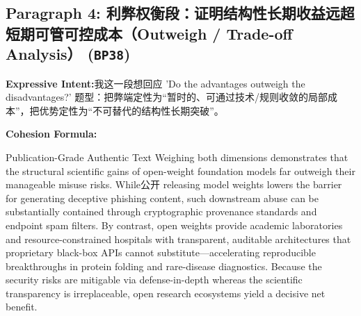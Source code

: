 \subsection*{Paragraph 4: 利弊权衡段：证明结构性长期收益远超短期可管可控成本（Outweigh / Trade-off Analysis） (\texttt{BP38})}
\noindent\textbf{Expressive Intent:}\enspace 我这一段想回应 'Do the advantages outweigh the disadvantages?' 题型：把弊端定性为“暂时的、可通过技术/规则收敛的局部成本”，把优势定性为“不可替代的结构性长期突破”。\par
\noindent\textbf{Cohesion Formula:}\par\vspace{4pt}
\begin{ExampleBox}{Publication-Grade Authentic Text}
Weighing both dimensions demonstrates that the structural scientific gains of open-weight foundation models far outweigh their manageable misuse risks. While公开 releasing model weights lowers the barrier for generating deceptive phishing content, such downstream abuse can be substantially contained through cryptographic provenance standards and endpoint spam filters. By contrast, open weights provide academic laboratories and resource-constrained hospitals with transparent, auditable architectures that proprietary black-box APIs cannot substitute---accelerating reproducible breakthroughs in protein folding and rare-disease diagnostics. Because the security risks are mitigable via defense-in-depth whereas the scientific transparency is irreplaceable, open research ecosystems yield a decisive net benefit.
\end{ExampleBox}
